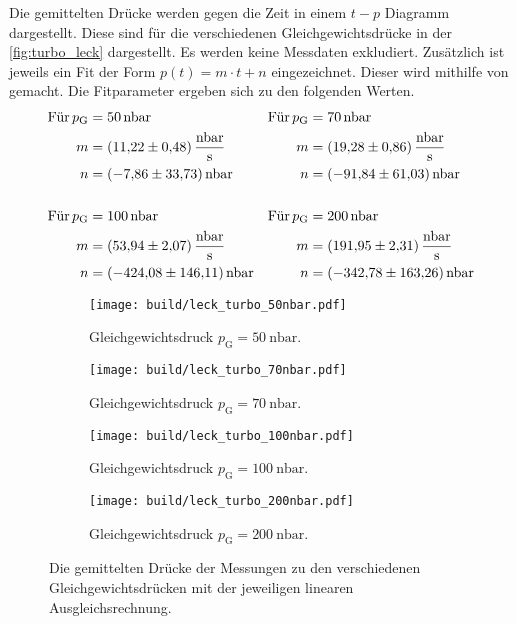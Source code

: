     \noindent Die gemittelten Drücke werden gegen die Zeit in einem $t-p$ Diagramm dargestellt. Diese sind für die verschiedenen Gleichgewichtsdrücke in der \autoref{fig:turbo_leck} dargestellt. 
    Es werden keine Messdaten exkludiert.  
    Zusätzlich ist jeweils ein Fit der Form $p(t) = m \cdot t + n $ eingezeichnet. Dieser wird mithilfe von \cite{scipy} gemacht. Die Fitparameter ergeben sich zu den folgenden Werten. 
    \begin{align*}
      \text{Für} \,  p_\text{G} &= \SI{50}{\nano\bar} & \text{Für} \,  p_\text{G} &= \SI{70}{\nano\bar}\\
      m &= \SI{11.22 \pm 0.48}{\nano\bar\per\second} & m &= \SI{19.28 \pm 0.86}{\nano\bar\per\second} \\
      n &= \SI{-7.86 \pm 33.73}{\nano\bar} & n &= \SI{-91.84 \pm 61.03}{\nano\bar} \\
      \\
      \text{Für} \,  p_\text{G} &= \SI{100}{\nano\bar} & \text{Für} \,  p_\text{G} &= \SI{200}{\nano\bar}\\
      m &= \SI{53.94(207)}{\nano\bar\per\second} & m &= \SI{191.95 \pm 2.31}{\nano\bar\per\second} \\
      n &= \SI{-424.08 (14611)}{\nano\bar} & n &= \SI{-342.78 \pm 163.26}{\nano\bar} 
    \end{align*} 

    \begin{figure}[h]
      \begin{subfigure}{0.48\textwidth}
        \centering
        \texttt{[image: build/leck\_turbo\_50nbar.pdf]}
        \caption{Gleichgewichtsdruck $p_\text{G} = \SI{50}{\nano\bar}$.}
        \label{fig:turbo_leck_50}
      \end{subfigure}
      \hfill
      \begin{subfigure}{0.48\textwidth}
        \centering
        \texttt{[image: build/leck\_turbo\_70nbar.pdf]}
        \caption{Gleichgewichtsdruck $p_\text{G} = \SI{70}{\nano\bar}$.}
        \label{fig:turbo_leck_70}
      \end{subfigure}
      \hfill
      \begin{subfigure}{0.48\textwidth}
        \centering
        \texttt{[image: build/leck\_turbo\_100nbar.pdf]}
        \caption{Gleichgewichtsdruck $p_\text{G} = \SI{100}{\nano\bar}$.}
        \label{fig:turbo_leck_100}
      \end{subfigure}
      \hfill
      \begin{subfigure}{0.48\textwidth}
        \centering
        \texttt{[image: build/leck\_turbo\_200nbar.pdf]}
        \caption{}Gleichgewichtsdruck $p_\text{G} = \SI{200}{\nano\bar}$.
        \label{fig:turbo_leck_200}
      \end{subfigure}
      \caption{Die gemittelten Drücke der Messungen zu den verschiedenen Gleichgewichtsdrücken mit der jeweiligen linearen Ausgleichsrechnung.}
      \label{fig:turbo_leck}
    \end{figure}

